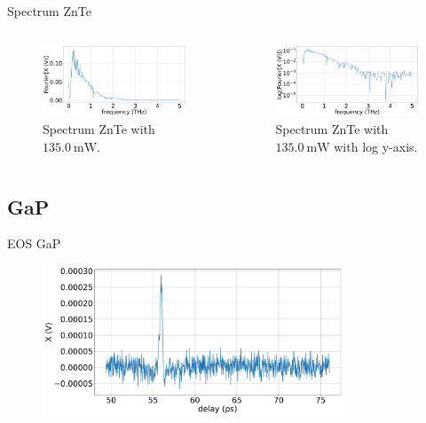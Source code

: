 \documentclass[aspectratio=1610, 9pt]{beamer}
\begin{document}
\begin{frame}{Spectrum ZnTe}
  \begin{columns}
    \begin{column}{.5\textwidth}
  \begin{figure}
    \includegraphics[width=\textwidth]{images/2_11_30_20normalFX.pdf}
    \caption{Spectrum ZnTe with $\SI{135.0}{\milli\W}$.}
  \end{figure}
  \end{column}
  \begin{column}{.5\textwidth}
    \begin{figure}
      \includegraphics[width=\textwidth]{images/2_11_30_20normallog(FX).pdf}
      \caption{Spectrum ZnTe with $\SI{135.0}{\milli\W}$ with log y-axis.}
    \end{figure}    
  \end{column}
  \end{columns}
\end{frame}

\subsection{GaP}
\begin{frame}{EOS GaP}
  \begin{figure}
    \includegraphics[width=0.8\textwidth]{images/GaP14_55_42normalX.pdf}
  \end{figure}
\end{frame}
\end{document}
